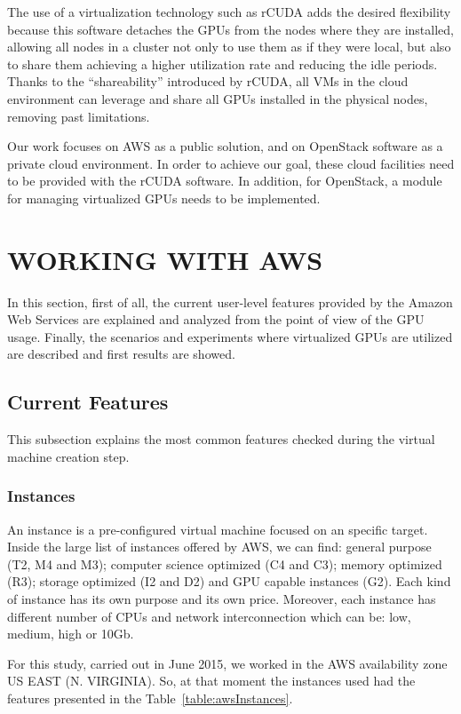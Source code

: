 \documentclass[a4paper,twoside]{article}
\begin{document}
The use of a virtualization technology such as {rCUDA} adds 
the desired flexibility because this software detaches the GPUs 
from the nodes where they are installed, allowing all nodes in a cluster
not only to use them as if they were local, but also to share them 
achieving a higher utilization rate and reducing the idle periods.
Thanks to the ``shareability'' introduced by {rCUDA}, all VMs in the cloud 
environment can leverage and share all GPUs installed in 
the physical nodes, removing past limitations. 

Our work focuses on AWS as a public 
solution, and on OpenStack software as a private cloud environment. 
In order to achieve our goal, these cloud facilities need to be provided with the {rCUDA} software. In addition, for OpenStack, a module for managing virtualized GPUs 
needs to be implemented.  



\section{\uppercase{Working with AWS}}
\label{sec:workingaws}
In this section, first of all, the current user-level features 
provided by the Amazon Web Services are explained and analyzed 
from the point of view of the GPU usage. 
Finally, the scenarios and experiments where virtualized GPUs are utilized are 
described and first results are showed.

\subsection{Current Features}
This subsection explains the most common features checked during 
the virtual machine creation step.

\subsubsection{Instances}

An instance is a pre-configured virtual machine focused on an 
specific target. Inside the large list of instances offered by AWS, 
we can find: general purpose (T2, M4 and M3); computer science optimized 
(C4 and C3); memory optimized (R3); storage optimized (I2 and D2) and 
GPU capable instances (G2). Each kind of instance has its own purpose and its 
own price. Moreover, each instance has different number of CPUs and network 
interconnection which can be: low, medium, high or 10Gb.

For this study, carried out in June 2015, we worked in the AWS availability zone US EAST (N. VIRGINIA). 
So, at that moment the instances used had the features presented in the Table~\ref{table:awsInstances}. 
\end{document}
